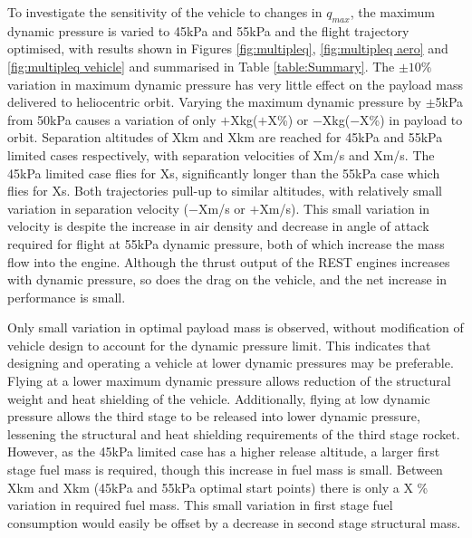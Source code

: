 \documentclass[]{aiaa-tc}
\newcommand{\FirstStageAltFortyFive}{X}
\newcommand{\FirstStageAltFiftyFive}{X}
\newcommand{\qVariationPluskg}{$+$Xkg}
\newcommand{\qVariationMinuskg}{$-$Xkg}
\newcommand{\qVariationPlus}{$+$X\%}
\newcommand{\qVariationMinus}{$-$X\%}
\newcommand{\SeparationAltFortyFivekPa}{X}
\newcommand{\SeparationAltFiftyFivekPa}{X}
\newcommand{\SeparationvFortyFivekPa}{X}
\newcommand{\SeparationvFiftyFivekPa}{X}
\begin{document}
To investigate the sensitivity of the vehicle to changes in $q_{max}$, the maximum dynamic pressure is varied to 45kPa and 55kPa and the flight trajectory optimised, with results shown in Figures \ref{fig:multipleq}, \ref{fig:multipleq aero} and \ref{fig:multipleq vehicle} and summarised in Table \ref{table:Summary}.
The $\pm10\%$ variation in maximum dynamic pressure has very little effect on the payload mass delivered to heliocentric orbit.  Varying the maximum dynamic pressure by $\pm$5kPa from 50kPa causes a variation of only  \qVariationPluskg (\qVariationPlus) or \qVariationMinuskg (\qVariationMinus) in payload to orbit.  
 Separation altitudes of \SeparationAltFortyFivekPa km and \SeparationAltFiftyFivekPa km are reached  for 45kPa and 55kPa limited cases respectively, with separation velocities of \SeparationvFortyFivekPa m/s and \SeparationvFiftyFivekPa m/s. The 45kPa limited case flies for Xs, significantly longer than the 55kPa case which flies for Xs.
 Both trajectories pull-up to similar altitudes, with relatively small variation in separation velocity ($-$Xm/s or $+$Xm/s).
  This small variation in velocity is despite the increase in air density and decrease in angle of attack required for flight at 55kPa dynamic pressure, both of which increase the mass flow into the engine. Although the thrust output of the REST engines increases with dynamic pressure, so does the drag on the vehicle, and the net increase in performance is small. 


Only small variation in optimal payload mass is observed, without modification of vehicle design to account for the dynamic pressure limit. This indicates that designing and operating a vehicle at lower dynamic pressures may be preferable. Flying at a lower maximum dynamic pressure allows reduction of the structural weight and heat shielding of the vehicle. Additionally, flying at low dynamic pressure allows the third stage to be released into lower dynamic pressure, lessening the structural and heat shielding requirements of the third stage rocket. However, as the 45kPa limited case has a higher release altitude, a larger first stage fuel mass is required, though this increase in fuel mass is small. Between \FirstStageAltFortyFive km  and \FirstStageAltFiftyFive km (45kPa and 55kPa optimal start points) there is only a X \% variation in required fuel mass. This small variation in first stage fuel consumption would easily be offset by a decrease in second stage structural mass. 
\end{document}
